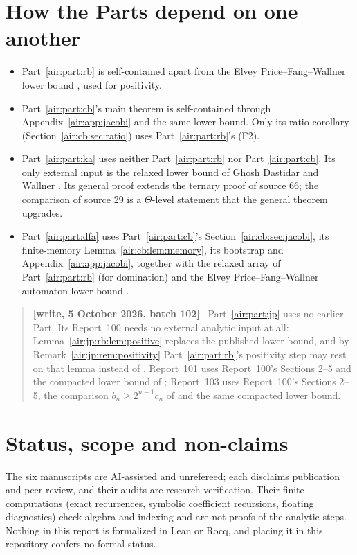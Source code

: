 \documentclass[11pt,letterpaper]{article}
\numberwithin{equation}{section}
\theoremstyle{remark}
\newenvironment{writenotejp}{\par\smallskip\begin{quote}\small\textbf{[write, 5 October 2026, batch 102]}\ }{\end{quote}\smallskip}
\begin{document}
\section*{How the Parts depend on one another}
\label{air:guide:dependencies}
\begin{itemize}
\item Part~\ref{air:part:rb} is self-contained apart from the Elvey Price--Fang--Wallner lower bound \cite{epfw}, used for positivity.
\item Part~\ref{air:part:cb}'s main theorem is self-contained through Appendix~\ref{air:app:jacobi} and the same lower bound. Only its ratio corollary (Section~\ref{air:cb:sec:ratio}) uses Part~\ref{air:part:rb}'s (F2).
\item Part~\ref{air:part:ka} uses neither Part~\ref{air:part:rb} nor Part~\ref{air:part:cb}. Its only external input is the relaxed lower bound of Ghosh Dastidar and Wallner \cite{gdw}. Its general proof extends the ternary proof of source 66; the comparison of source 29 is a $\Theta$-level statement that the general theorem upgrades.
\item Part~\ref{air:part:dfa} uses Part~\ref{air:part:cb}'s Section~\ref{air:cb:sec:jacobi}, its finite-memory Lemma~\ref{air:cb:lem:memory}, its bootstrap and Appendix~\ref{air:app:jacobi}, together with the relaxed array of Part~\ref{air:part:rb} (for domination) and the Elvey Price--Fang--Wallner automaton lower bound \cite{dfa}.
\end{itemize}
\begin{writenotejp}
Part~\ref{air:part:jp} uses no earlier Part. Its Report~100 needs no external analytic input at all: Lemma~\ref{air:jp:rb:lem:positive} replaces the published lower bound, and by Remark~\ref{air:jp:rem:positivity} Part~\ref{air:part:rb}'s positivity step may rest on that lemma instead of \cite{epfw}. Report~101 uses Report~100's Sections 2--5 and the compacted lower bound of \cite{epfw}; Report~103 uses Report~100's Sections 2--5, the comparison $b_n\ge2^{n-1}c_n$ of \cite{dfa} and the same compacted lower bound.
\end{writenotejp}

\section*{Status, scope and non-claims}
\label{air:guide:status}
The six manuscripts are AI-assisted and unrefereed; each disclaims publication and peer review, and their audits are research verification. Their finite computations (exact recurrences, symbolic coefficient recursions, floating diagnostics) check algebra and indexing and are not proofs of the analytic steps. Nothing in this report is formalized in Lean or Rocq, and placing it in this repository confers no formal status.
\end{document}
